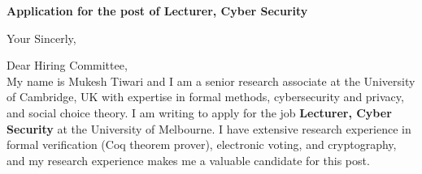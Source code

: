 \documentclass[11pt,a4paper,roman]{moderncv}
\begin{document}
\date{}
\opening{\textbf{Application for the post of Lecturer, Cyber Security}}
\closing{Your Sincerly, \vspace{-1em}}



\makelettertitle


Dear Hiring Committee, 
\\
\vspace{1em}
My name is Mukesh Tiwari and I am a senior research associate at 
the University of Cambridge, UK with expertise in  formal methods, cybersecurity and privacy, 
and social choice theory. I am writing to apply for the job \textbf{Lecturer, Cyber Security} 
at the University of Melbourne. 
I have extensive research experience in
formal verification (Coq theorem prover), electronic voting, and cryptography, and my research 
experience makes me a valuable candidate for this post.
\end{document}
